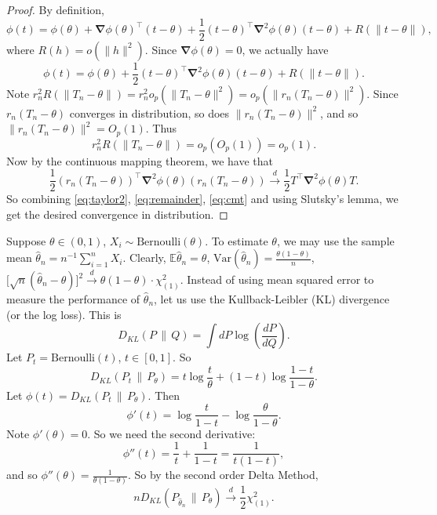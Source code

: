 \begin{proof}
By definition,
\[
\phi(t) = \phi(\theta) + \boldsymbol{\nabla} \phi(\theta)^\top (t - \theta) + \frac{1}{2}(t - \theta)^\top \boldsymbol{\nabla}^2 \phi(\theta)(t - \theta) + R(\|t - \theta\|),
\]
where $R(h) = o(\|h\|^2)$. Since $\boldsymbol{\nabla} \phi(\theta) = 0$, we actually have
\begin{equation}\label{eq:taylor2}
\phi(t) = \phi(\theta) + \frac{1}{2}(t - \theta)^\top \boldsymbol{\nabla}^2 \phi(\theta)(t - \theta) + R(\|t - \theta\|).
\end{equation}
Note $r_n^2 R(\|T_n - \theta\|) = r_n^2 o_p(\|T_n - \theta\|^2) = o_p(\|r_n(T_n - \theta)\|^2)$. Since $r_n(T_n - \theta)$ converges in distribution, so does $\|r_n(T_n - \theta)\|^2$, and so $\|r_n(T_n - \theta)\|^2 = O_p(1)$. Thus
\begin{equation}\label{eq:remainder}
r_n^2 R(\|T_n - \theta\|) = o_p(O_p(1)) = o_p(1).
\end{equation}
Now by the continuous mapping theorem, we have that
\begin{equation}\label{eq:cmt}
\frac{1}{2}(r_n(T_n - \theta))^\top \boldsymbol{\nabla}^2 \phi(\theta)(r_n(T_n - \theta)) \xrightarrow{d} \frac{1}{2} T^\top \boldsymbol{\nabla}^2 \phi(\theta) T.
\end{equation}
So combining \eqref{eq:taylor2}, \eqref{eq:remainder}, \eqref{eq:cmt} and using Slutsky's lemma, we get the desired convergence in distribution.
\end{proof}
\begin{exam}
    Suppose $\theta \in (0,1)$, $X_i \sim \text{Bernoulli}(\theta)$. To estimate $\theta$, we may use the sample mean $\hat{\theta}_n = n^{-1}\sum_{i=1}^n X_i$. Clearly, $\mathbb{E}\hat{\theta}_n = \theta$, $\text{Var}(\hat{\theta}_n) = \frac{\theta(1-\theta)}{n}$, $\big[\sqrt{n}(\hat{\theta}_n - \theta)\big]^2 \xrightarrow{d} \theta(1-\theta)\cdot \chi_{(1)}^2$. 
Instead of using mean squared error to measure the performance of $\hat{\theta}_n$, 
let us use the Kullback-Leibler (KL) divergence (or the log loss). This is
\[
  D_{KL}(P \,\|\, Q) = \int dP \log\!\left(\frac{dP}{dQ}\right).
\]
Let $P_t = \text{Bernoulli}(t)$, $t \in [0,1]$. So
\[
  D_{KL}(P_t \,\|\, P_\theta) = t\log\frac{t}{\theta} + (1-t)\log\frac{1-t}{1-\theta}.
\]
Let $\phi(t) = D_{KL}(P_t \,\|\, P_\theta)$. Then
\[
  \phi'(t) = \log\frac{t}{1-t} - \log\frac{\theta}{1-\theta}.
\]
Note $\phi'(\theta) = 0$. So we need the second derivative:
\[
  \phi''(t) = \frac{1}{t} + \frac{1}{1-t} = \frac{1}{t(1-t)},
\]
and so $\phi''(\theta) = \frac{1}{\theta(1-\theta)}$. So by the second order Delta Method,
\[
  n D_{KL}(P_{\hat{\theta}_n} \,\|\, P_\theta) \xrightarrow{d} \frac{1}{2}\chi^2_{(1)}.
\]
\end{exam}

